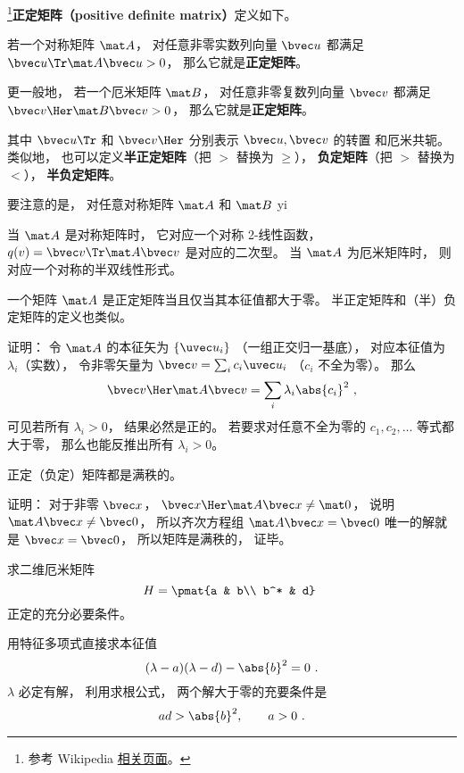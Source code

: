 

\footnote{参考 Wikipedia \href{https://en.wikipedia.org/wiki/Definite_matrix}{相关页面}。}\textbf{正定矩阵（positive definite matrix）}定义如下。
\begin{definition}{}
若一个对称矩阵 $\mat A$， 对任意非零实数列向量 $\bvec u$ 都满足 $\bvec u\Tr \mat A \bvec u > 0$， 那么它就是\textbf{正定矩阵}。

更一般地， 若一个厄米矩阵 $\mat B$， 对任意非零复数列向量 $\bvec v$ 都满足 $\bvec v\Her \mat B \bvec v > 0$， 那么它就是\textbf{正定矩阵}。
\end{definition}
其中 $\bvec u\Tr$ 和 $\bvec v\Her$ 分别表示 $\bvec u, \bvec v$ 的转置 和厄米共轭。 类似地， 也可以定义\textbf{半正定矩阵}（把 $>$ 替换为 $\geqslant$）， \textbf{负定矩阵}（把 $>$ 替换为 $<$）， \textbf{半负定矩阵}。

要注意的是， 对任意对称矩阵 $\mat A$ 和 $\mat B$ yi

当 $\mat A$ 是对称矩阵时， 它对应一个对称 2-线性函数， $q(v) = \bvec v\Tr \mat A \bvec v$ 是对应的二次型。 当 $\mat A$ 为厄米矩阵时， 则对应一个对称的半双线性形式。

\begin{theorem}{}
一个矩阵 $\mat A$ 是正定矩阵当且仅当其本征值都大于零。 半正定矩阵和（半）负定矩阵的定义也类似。
\end{theorem}

证明： 令 $\mat A$ 的本征矢为 $\{\uvec u_i\}$ （一组正交归一基底）， 对应本征值为 $\lambda_i$（实数）， 令非零矢量为 $\bvec v = \sum_i c_i \uvec u_i$ （$c_i$ 不全为零）。 那么
\begin{equation}
\bvec v\Her \mat A \bvec v = \sum_i \lambda_i \abs{c_i}^2~,
\end{equation}
可见若所有 $\lambda_i > 0$， 结果必然是正的。 若要求对任意不全为零的 $c_1,c_2,\dots$ 等式都大于零， 那么也能反推出所有 $\lambda_i > 0$。

\begin{theorem}{}
正定（负定）矩阵都是满秩的。
\end{theorem}
证明： 对于非零 $\bvec x$， $\bvec x\Her \mat A \bvec x \ne \mat 0$， 说明 $\mat A\bvec x \ne \bvec 0$， 所以齐次方程组 $\mat A\bvec x = \bvec 0$ 唯一的解就是 $\bvec x = \bvec 0$， 所以矩阵是满秩的， 证毕。

\begin{example}{}
求二维厄米矩阵
\begin{equation}
H = \pmat{a & b\\ b^* & d}~
\end{equation}
正定的充分必要条件。

用特征多项式直接求本征值
\begin{equation}
(\lambda - a)(\lambda - d) - \abs{b}^2 = 0~.
\end{equation}
$\lambda$ 必定有解， 利用求根公式， 两个解大于零的充要条件是
\begin{equation}
ad > \abs{b}^2, \qquad
a > 0~.
\end{equation}
\end{example}
